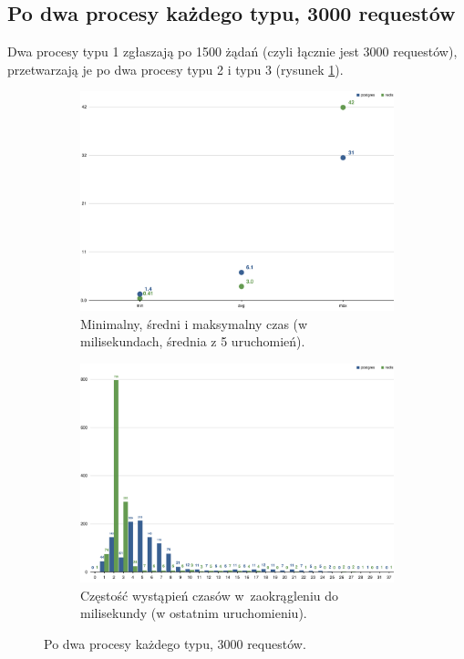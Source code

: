 \documentclass[a4paper,11pt]{article}
\begin{document}
\subsection{Po dwa procesy każdego typu, 3000 requestów}

Dwa procesy typu 1 zgłaszają po 1500 żądań (czyli łącznie jest 3000 requestów), przetwarzają je po dwa procesy typu 2 i typu 3 (rysunek \ref{2-2-2}).
\begin{figure}[h!]
  \centering
  \begin{subfigure}{\textwidth}
    \centering
    \includegraphics[width=\textwidth]{charts/2-2-2-min-avg-max}
    \caption{Minimalny, średni i maksymalny czas (w milisekundach, średnia z 5 uruchomień).}
  \end{subfigure}
  \begin{subfigure}{\textwidth}
    \centering
    \includegraphics[width=\textwidth]{charts/2-2-2-grouped}
    \caption{Częstość wystąpień czasów w~zaokrągleniu do milisekundy (w ostatnim uruchomieniu).}
  \end{subfigure}
  \caption{Po dwa procesy każdego typu, 3000 requestów.}
  \label{2-2-2}
\end{figure}
\end{document}

